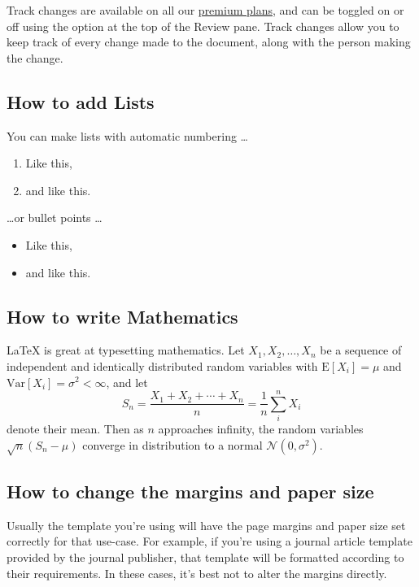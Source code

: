 \documentclass{article}
\begin{document}
	Track changes are available on all our
	\href{https://www.overleaf.com/user/subscription/plans}{premium plans}, and can
	be toggled on or off using the option at the top of the Review pane. Track
	changes allow you to keep track of every change made to the document, along with
	the person making the change.

	\subsection{How to add Lists}

	You can make lists with automatic numbering \dots

	\begin{enumerate}
		\item Like this,

		\item and like this.
	\end{enumerate}
	\dots or bullet points \dots
	\begin{itemize}
		\item Like this,

		\item and like this.
	\end{itemize}

	\subsection{How to write Mathematics}

	\LaTeX{} is great at typesetting mathematics. Let $X_{1}, X_{2}, \ldots, X_{n}$
	be a sequence of independent and identically distributed random variables with
	$\text{E}[X_{i}] = \mu$ and $\text{Var}[X_{i}] = \sigma^{2}< \infty$, and
	let
	\[
		S_{n}= \frac{X_{1}+ X_{2}+ \cdots + X_{n}}{n}= \frac{1}{n}\sum_{i}^{n}X_{i}
	\]
	denote their mean. Then as $n$ approaches infinity, the random variables
	$\sqrt{n}(S_{n}- \mu)$ converge in distribution to a normal
	$\mathcal{N}(0, \sigma^{2})$.

	\subsection{How to change the margins and paper size}

	Usually the template you're using will have the page margins and paper size set
	correctly for that use-case. For example, if you're using a journal article template
	provided by the journal publisher, that template will be formatted according
	to their requirements. In these cases, it's best not to alter the margins
	directly.
\end{document}
